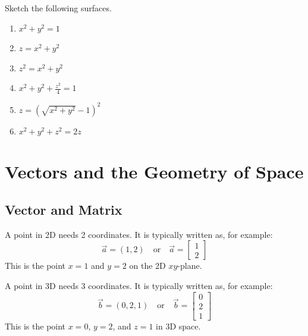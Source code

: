 \documentclass[11pt,fleqn]{book} %
\begin{document}
\begin{exercise}
    Sketch the following surfaces.

    \begin{minipage}[t]{0.45\linewidth} 
        \begin{enumerate}
            \item $x^2 + y^2 = 1$

            \item $z = x^2 + y^2$

            \item $z^2 = x^2 + y^2$
        \end{enumerate}
    \end{minipage}
    \begin{minipage}[t]{0.45\linewidth} 
        \begin{enumerate} \setcounter{enumi}{3}
            \item $x^2 + y^2 + \frac{z^2}{4} = 1$
            \item $z = \left( \sqrt{x^2 + y^2} - 1 \right)^2$
            \item $x^2 + y^2 + z^2 = 2z$
        \end{enumerate}
    \end{minipage}
\end{exercise}


\chapter{Vectors and the Geometry of Space}

\section{Vector and Matrix}

A point in 2D needs 2 coordinates. It is typically written as, for example: $$\vec{a} = (1, 2) \quad\text{or}\quad \vec{a} = \begin{bmatrix} 1 \\ 2 \end{bmatrix}$$ This is the point $x = 1$ and $y = 2$ on the 2D $xy$-plane.

A point in 3D needs 3 coordinates. It is typically written as, for example: $$\vec{b} = (0, 2, 1) \quad\text{or}\quad \vec{b} = \begin{bmatrix} 0 \\ 2 \\ 1 \end{bmatrix}$$ This is the point $x = 0$, $y = 2$, and $z = 1$ in 3D space.
\end{document}

